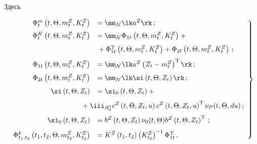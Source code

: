 Здесь

    \begin{equation}

    \left.

    \begin{array}{rl}

    \Phi_t^m\left(t,\Theta,m_t^Z, K_t^Z\right)&= \mm_{\cal N}\lk a^Z\rk\,;

\\[6pt]

        \Phi_t^K \left(t, \Theta,m_t^Z, K_t^Z\right)&=\mm_{\cal N}\Phi_{1t} 

    \left(t,\Theta,m_t^Z, K_t^Z\right)+{}\\[7pt]

    &{}+

    \Phi_{1t}^{\mathrm{T}} \left(t,\Theta,m_t^Z, K_t^Z\right)

    +\Phi_{2t}\left(t,\Theta,m_t^Z, K_t^Z\right)\,;

\\[7pt]

    \Phi_{1t}

     \left(t,\Theta,m_t^Z, K_t^Z\right)&=\mm_{\cal N} \lk a^Z 

     \left(Z_t - m_t^Z\right)^{\mathrm{T}}\rk\,;\\[7pt]

\Phi_{2t} \left(t,\Theta,m_t^Z, K_t^Z\right)&=

    \mm_{\cal N} \lk \si\left(t,\Theta,Z_t\right)\rk\,;

\\[7pt] 

    \si\left(t,\Theta,Z_t\right)&= \si_0\left(t,\Theta,Z_t\right) +{}\\[7pt]

    &\hspace*{-8mm}{}+

    \displaystyle\iii_{R_0^q}  c^Z\left(t,\Theta,Z_t,u\right) 

    c^Z \left(t,\Theta,Z_t,u\right)^{\mathrm{T}} \nu_P (t,\Theta,du)\,;

\\[7pt]

    \si_0\left(t,\Theta,Z_t\right) &=  b^Z \left(t,\Theta,Z_t\right) 

    \nu_0 (t,\Theta) b^Z\left(t,\Theta,Z_t\right)^{\mathrm{T}}\,;

\\[7pt]

    \Phi_{t_1, t_2}^k \left(t_1, t_2, \Theta, m_{t_2}^Z, K_{t_2}^Z\right)& = 

    K^Z \left(t_1, t_2\right) \left(K_{t_2}^Z\right)^{-1} \Phi_{1t}^{\mathrm{T}}\,,

    \end{array}

    \right\}

    \label{e3.2-s2}

    \end{equation}

